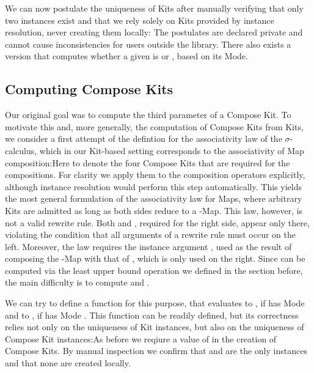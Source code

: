 \documentclass[screen,nonacm]{acmart}
\begin{document}
We can now postulate the uniqueness of Kits after manually verifying that only
two instances exist and that we rely solely on Kits provided by instance
resolution, never creating them locally: \AUniqueKits{}The postulates are
declared private and cannot cause inconsistencies for users outside the
library. There also exists a version  that computes
whether a given  is  or , based on
its Mode.

\subsection{Computing Compose Kits}\label{sec:ags-cck}
Our original goal was to compute the third parameter of a Compose Kit. To
motivate this and, more generally, the computation of Compose Kits from Kits,
we consider a first attempt of the defintion for the associativity law of the
$σ$-calculus, which in our Kit-based setting corresponds to the associativity
of Map composition:\AAssocTryO{}Here  to  denote
the four Compose Kits that are required for the compositions. For clarity we
apply them to the composition operators explicitly, although instance
resolution would perform this step automatically. This yields the most general
formulation of the associativity law for Maps, where arbitrary Kits are
admitted as long as both sides reduce to a -Map. This law,
however, is not a valid rewrite rule. Both  and ,
required for the right side, appear only there, violating the condition that
all arguments of a rewrite rule must occur on the left. Moreover, the law
requires the instance argument , used as the result of composing
the -Map with that of , which is only used on the
right. Since  can be computed via the least upper bound operation
we defined in the section before, the main difficulty is to compute
 and .

We can try to define a function \ACompCKitSafe{} for this purpose, that
evaluates to , if  has Mode
 and to , if  has
Mode . This function can be readily defined, but
its correctness relies not only on the uniqueness of Kit instances, but also on
the uniqueness of Compose Kit instances:\AUniqueCKits{}As before we reqiure a
value of  in the creation of Compose Kits. By manual
inspection we confirm that  and  are the only
instances and that none are created locally.
\end{document}
